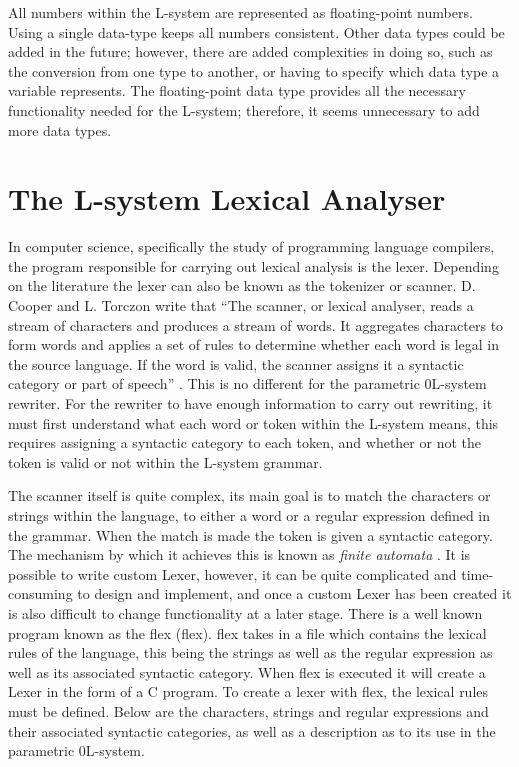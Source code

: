 All numbers within the L-system are represented as floating-point numbers. Using a single data-type keeps all numbers consistent. Other data types could be added in the future; however, there are added complexities in doing so, such as the conversion from one type to another, or having to specify which data type a variable represents. The floating-point data type provides all the necessary functionality needed for the L-system; therefore, it seems unnecessary to add more data types. 

\section{The L-system Lexical Analyser} \label{Flex}

In computer science, specifically the study of programming language compilers, the program responsible for carrying out lexical analysis is the lexer. Depending on the literature the lexer can also be known as the tokenizer or scanner. D. Cooper and L. Torczon write that ``The scanner, or lexical analyser, reads a stream of characters and produces a stream of words. It aggregates characters to form words and applies a set of rules to determine whether each word is legal in the source language. If the word is valid, the scanner assigns it a syntactic category or part of speech'' \cite{cooper2011engineering}. This is no different for the parametric 0L-system rewriter. For the rewriter to have enough information to carry out rewriting, it must first understand what each word or token within the L-system means, this requires assigning a syntactic category to each token, and whether or not the token is valid or not within the L-system grammar.  

The scanner itself is quite complex, its main goal is to match the characters or strings within the language, to either a word or a regular expression defined in the grammar. When the match is made the token is given a syntactic category. The mechanism by which it achieves this is known as \textit{finite automata} \cite{wilhelm2013compiler}. It is possible to write custom \gls{Lexer}, however, it can be quite complicated and time-consuming to design and implement, and once a custom \gls{Lexer} has been created it is also difficult to change functionality at a later stage. There is a well known program known as the \acrlong{flex} (\acrshort{flex}). \acrshort{flex} takes in a file which contains the lexical rules of the language, this being the strings as well as the regular expression as well as its associated syntactic category. When \acrshort{flex} is executed it will create a \gls{Lexer} in the form of a C program. To create a lexer with \acrshort{flex}, the lexical rules must be defined. Below are the characters, strings and regular expressions and their associated syntactic categories, as well as a description as to its use in the parametric 0L-system. 

